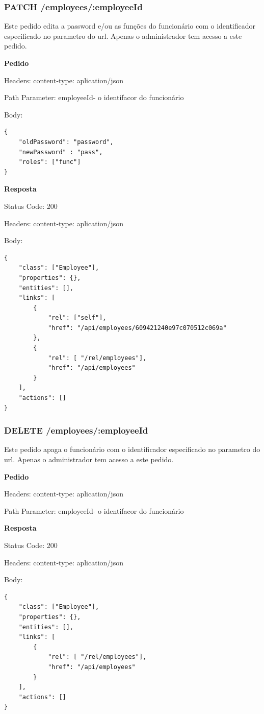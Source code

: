 \documentclass[12pt,a4paper]{article}
\begin{document}
\subsubsection{PATCH /employees/:employeeId}
Este pedido edita a password e/ou as funções do funcionário com o identificador especificado no parametro do url. Apenas o administrador tem acesso a este pedido.\par
\vspace{0.5 cm}
\textbf{Pedido}\par
Headers: content-type: aplication/json \par
Path Parameter: employeeId- o identifacor do funcionário \par
Body: 
\begin{verbatim}
{
    "oldPassword": "password",
    "newPassword" : "pass",
    "roles": ["func"]
}
\end{verbatim}

\textbf{Resposta}\par
Status Code: 200\par
Headers: content-type: aplication/json\par 
Body: 
\begin{verbatim}
{
    "class": ["Employee"],
    "properties": {},
    "entities": [],
    "links": [         
        {
            "rel": ["self"],
            "href": "/api/employees/609421240e97c070512c069a"
        },
        {
            "rel": [ "/rel/employees"],
            "href": "/api/employees"
        }
    ],
    "actions": []
}
\end{verbatim}
\pagebreak
\subsubsection{DELETE /employees/:employeeId}
Este pedido apaga o funcionário com o identificador especificado no parametro do url. Apenas o administrador tem acesso a este pedido.\par
\vspace{0.5 cm}
\textbf{Pedido}\par
Headers: content-type: aplication/json \par
Path Parameter: employeeId- o identifacor do funcionário \par
\vspace{0.5 cm}
\textbf{Resposta}\par
Status Code: 200\par
Headers: content-type: aplication/json\par 
Body: 
\begin{verbatim}
{
    "class": ["Employee"],
    "properties": {},
    "entities": [],
    "links": [         
        {
            "rel": [ "/rel/employees"],
            "href": "/api/employees"
        }
    ],
    "actions": []
}
\end{verbatim}
\end{document}
